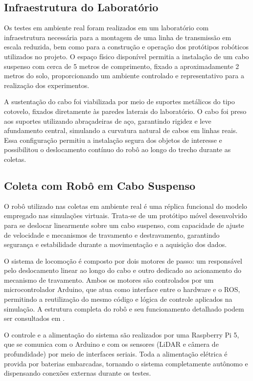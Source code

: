 \subsection{Infraestrutura do Laboratório}

Os testes em ambiente real foram realizados em um laboratório com infraestrutura necessária para a montagem de uma linha de transmissão em escala reduzida, bem como para a construção e operação dos protótipos robóticos utilizados no projeto. O espaço físico disponível permitia a instalação de um cabo suspenso com cerca de 5 metros de comprimento, fixado a aproximadamente 2 metros do solo, proporcionando um ambiente controlado e representativo para a realização dos experimentos.

A sustentação do cabo foi viabilizada por meio de suportes metálicos do tipo cotovelo, fixados diretamente às paredes laterais do laboratório. O cabo foi preso aos suportes utilizando abraçadeiras de aço, garantindo rigidez e leve afundamento central, simulando a curvatura natural de cabos em linhas reais. Essa configuração permitiu a instalação segura dos objetos de interesse e possibilitou o deslocamento contínuo do robô ao longo do trecho durante as coletas.

\subsection{Coleta com Robô em Cabo Suspenso}

O robô utilizado nas coletas em ambiente real é uma réplica funcional do modelo empregado nas simulações virtuais. Trata-se de um protótipo móvel desenvolvido para se deslocar linearmente sobre um cabo suspenso, com capacidade de ajuste de velocidade e mecanismos de travamento e destravamento, garantindo segurança e estabilidade durante a movimentação e a aquisição dos dados.

O sistema de locomoção é composto por dois motores de passo: um responsável pelo deslocamento linear ao longo do cabo e outro dedicado ao acionamento do mecanismo de travamento. Ambos os motores são controlados por um microcontrolador Arduino, que atua como interface entre o hardware e o ROS, permitindo a reutilização do mesmo código e lógica de controle aplicados na simulação. A estrutura completa do robô e seu funcionamento detalhado podem ser consultados em .

O controle e a alimentação do sistema são realizados por uma Raspberry Pi 5, que se comunica com o Arduino e com os sensores (LiDAR e câmera de profundidade) por meio de interfaces seriais. Toda a alimentação elétrica é provida por baterias embarcadas, tornando o sistema completamente autônomo e dispensando conexões externas durante os testes.

